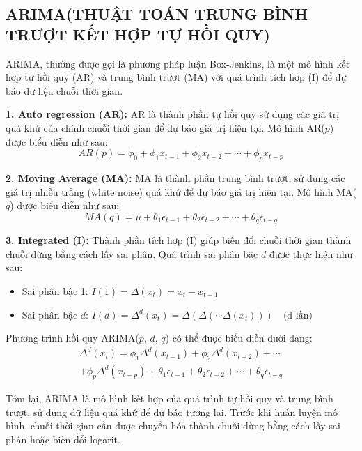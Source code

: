 \documentclass[conference]{IEEEtran}
\begin{document}
\subsection{ARIMA(THUẬT TOÁN TRUNG BÌNH TRƯỢT KẾT HỢP TỰ HỒI QUY)}

ARIMA, thường được gọi là phương pháp luận Box-Jenkins, là một mô hình kết hợp tự hồi quy (AR) và trung bình trượt (MA) với quá trình tích hợp (I) để dự báo dữ liệu chuỗi thời gian. 

\textbf{1. Auto regression (AR):} 
AR là thành phần tự hồi quy sử dụng các giá trị quá khứ của chính chuỗi thời gian để dự báo giá trị hiện tại. Mô hình AR($p$) được biểu diễn như sau:
\begin{equation}
AR(p) = \phi_0 + \phi_1 x_{t-1} + \phi_2 x_{t-2} + \cdots + \phi_p x_{t-p}
\end{equation}

\textbf{2. Moving Average (MA):}
MA là thành phần trung bình trượt, sử dụng các giá trị nhiễu trắng (white noise) quá khứ để dự báo giá trị hiện tại. Mô hình MA($q$) được biểu diễn như sau:
\begin{equation}
MA(q) = \mu + \theta_1 \epsilon_{t-1} + \theta_2 \epsilon_{t-2} + \cdots + \theta_q \epsilon_{t-q}
\end{equation}

\textbf{3. Integrated (I):}
Thành phần tích hợp (I) giúp biến đổi chuỗi thời gian thành chuỗi dừng bằng cách lấy sai phân. Quá trình sai phân bậc $d$ được thực hiện như sau:
\begin{itemize}
  \item Sai phân bậc 1: $I(1) = \Delta(x_t) = x_t - x_{t-1}$
  \item Sai phân bậc $d$: $I(d) = \Delta^d(x_t) = \Delta(\Delta(\cdots \Delta(x_t))) \quad \text{(d lần)}$
\end{itemize}

Phương trình hồi quy ARIMA($p$, $d$, $q$) có thể được biểu diễn dưới dạng:
\begin{multline}
\Delta^d(x_t) = \phi_1 \Delta^d(x_{t-1}) + \phi_2 \Delta^d(x_{t-2}) + \cdots \\
+ \phi_p \Delta^d(x_{t-p}) + \theta_1 \epsilon_{t-1} + \theta_2 \epsilon_{t-2} + \cdots + \theta_q \epsilon_{t-q}
\end{multline}


Tóm lại, ARIMA là mô hình kết hợp của quá trình tự hồi quy và trung bình trượt, sử dụng dữ liệu quá khứ để dự báo tương lai. Trước khi huấn luyện mô hình, chuỗi thời gian cần được chuyển hóa thành chuỗi dừng bằng cách lấy sai phân hoặc biến đổi logarit.
\end{document}
